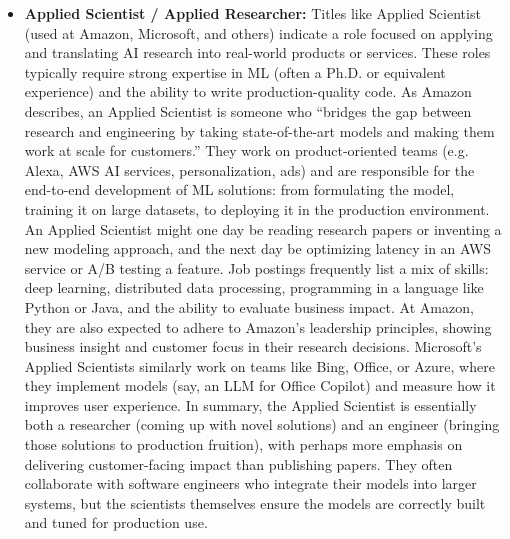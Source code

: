 \documentclass[pdflatex,sn-mathphys-num]{sn-jnl}%
\theoremstyle{thmstyleone}%
\theoremstyle{thmstyletwo}%
\theoremstyle{thmstylethree}%
\begin{document}
\begin{itemize}
\item \textbf{Applied Scientist / Applied Researcher:} Titles like Applied Scientist (used at Amazon, Microsoft, and others) indicate a role focused on applying and translating AI research into real-world products or services. These roles typically require strong expertise in ML (often a Ph.D. or equivalent experience) and the ability to write production-quality code. As Amazon describes, an Applied Scientist is someone who “bridges the gap between research and engineering by taking state-of-the-art models and making them work at scale for customers.” They work on product-oriented teams (e.g. Alexa, AWS AI services, personalization, ads) and are responsible for the end-to-end development of ML solutions: from formulating the model, training it on large datasets, to deploying it in the production environment. An Applied Scientist might one day be reading research papers or inventing a new modeling approach, and the next day be optimizing latency in an AWS service or A/B testing a feature. Job postings frequently list a mix of skills: deep learning, distributed data processing, programming in a language like Python or Java, and the ability to evaluate business impact. At Amazon, they are also expected to adhere to Amazon’s leadership principles, showing business insight and customer focus in their research decisions. Microsoft’s Applied Scientists similarly work on teams like Bing, Office, or Azure, where they implement models (say, an LLM for Office Copilot) and measure how it improves user experience. In summary, the Applied Scientist is essentially both a researcher (coming up with novel solutions) and an engineer (bringing those solutions to production fruition), with perhaps more emphasis on delivering customer-facing impact than publishing papers. They often collaborate with software engineers who integrate their models into larger systems, but the scientists themselves ensure the models are correctly built and tuned for production use. 

\begin{figure}[t]
  \centering
  \begin{minipage}{1.0\linewidth}
    \centering
{}
\end{minipage}
\end{figure}
\end{itemize}
\end{document}
